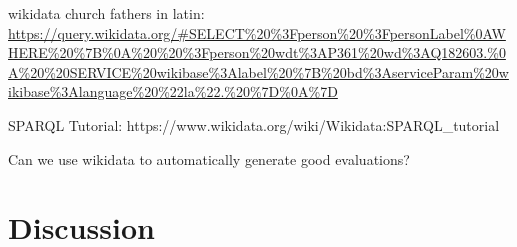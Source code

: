 \documentclass[11pt]{article}
\begin{document}
wikidata church fathers in latin: \url{https://query.wikidata.org/#SELECT%20%3Fperson%20%3FpersonLabel%0AWHERE%20%7B%0A%20%20%3Fperson%20wdt%3AP361%20wd%3AQ182603.%0A%20%20SERVICE%20wikibase%3Alabel%20%7B%20bd%3AserviceParam%20wikibase%3Alanguage%20%22la%22.%20%7D%0A%7D}

SPARQL Tutorial: https://www.wikidata.org/wiki/Wikidata:SPARQL_tutorial

Can we use wikidata to automatically generate good evaluations?

\section{Discussion}
\label{sec:discussion}




\end{document}
